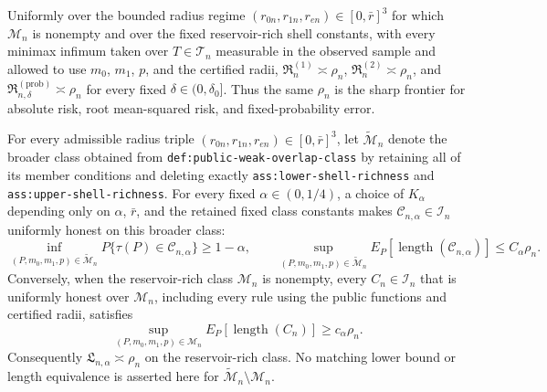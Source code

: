 Uniformly over the bounded radius regime \((r_{0n},r_{1n},r_{en})\in[0,\bar r]^3\) for which \(\mathcal M_n\) is nonempty and over the fixed reservoir-rich shell constants, with every minimax infimum taken over \(T\in\mathcal T_n\) measurable in the observed sample and allowed to use \(m_0\), \(m_1\), \(p\), and the certified radii, \(\mathfrak R_n^{(1)}\asymp\rho_n\), \(\mathfrak R_n^{(2)}\asymp\rho_n\), and \(\mathfrak R_{n,\delta}^{(\mathrm{prob})}\asymp\rho_n\) for every fixed \(\delta\in(0,\delta_0]\). Thus the same \(\rho_n\) is the sharp frontier for absolute risk, root mean-squared risk, and fixed-probability error.

For every admissible radius triple \((r_{0n},r_{1n},r_{en})\in[0,\bar r]^3\), let \(\widetilde{\mathcal M}_n\) denote the broader class obtained from \texttt{def:public-weak-overlap-class} by retaining all of its member conditions and deleting exactly \texttt{ass:lower-shell-richness} and \texttt{ass:upper-shell-richness}.  For every fixed \(\alpha\in(0,1/4)\), a choice of \(K_\alpha\) depending only on \(\alpha\), \(\bar r\), and the retained fixed class constants makes \(\mathcal C_{n,\alpha}\in\mathcal I_n\) uniformly honest on this broader class:
\[
\inf_{(P,m_0,m_1,p)\in\widetilde{\mathcal M}_n}
P\{\tau(P)\in\mathcal C_{n,\alpha}\}\geq1-\alpha,
\qquad
\sup_{(P,m_0,m_1,p)\in\widetilde{\mathcal M}_n}
E_P[\operatorname{length}(\mathcal C_{n,\alpha})]
\leq C_\alpha\rho_n.
\]
Conversely, when the reservoir-rich class \(\mathcal M_n\) is nonempty, every \(C_n\in\mathcal I_n\) that is uniformly honest over \(\mathcal M_n\), including every rule using the public functions and certified radii, satisfies
\[
\sup_{(P,m_0,m_1,p)\in\mathcal M_n}
E_P[\operatorname{length}(C_n)]\geq c_\alpha\rho_n.
\]
Consequently \(\mathfrak L_{n,\alpha}\asymp\rho_n\) on the reservoir-rich class.  No matching lower bound or length equivalence is asserted here for \(\widetilde{\mathcal M}_n\setminus\mathcal M_n\).
